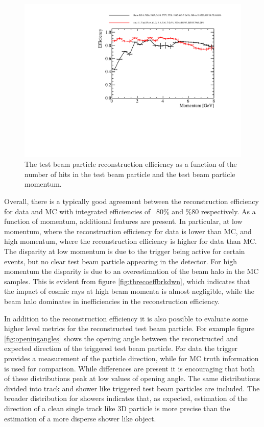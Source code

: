 \begin{figure}
\includegraphics[width=1.0\textwidth]{Figures/Metrics/Data/Beam/BeamParticleEfficiencyVsMomentum.pdf}
\caption{The test beam particle reconstruction efficiency as a function of the number of hits in the test beam particle and the test beam particle momentum.}
\label{fig:datamcrecoeff}
\end{figure}

Overall, there is a typically good agreement between the reconstruction efficiency for data and MC with integrated efficiencies of ~80\% and \%80 respectively.  As a function of momentum, additional features are present.  In particular, at low momentum, where the reconstruction efficiency for data is lower than MC, and high momentum, where the reconstruction efficiency is higher for data than MC.  The disparity at low momentum is due to the trigger being active for certain events, but no clear test beam particle appearing in the detector.  %
For high momentum the disparity is due to an overestimation of the beam halo in the MC samples.  This is evident from figure \ref{fig:tbrecoeffbrkdwn}, which indicates that the impact of cosmic rays at high beam momenta is almost negligible, while the beam halo dominates in inefficiencies in the reconstruction efficiency.  

In addition to the reconstruction efficiency it is also possible to evaluate some higher level metrics for the reconstructed test beam particle.  For example figure \ref{fig:openingangles} shows the opening angle between the reconstructed and expected direction of the triggered test beam particle.  For data the trigger provides a measurement of the particle direction, while for MC truth information is used for comparison.  While differences are present it is encouraging that both of these distributions peak at low values of opening angle.  The same distributions divided into track and shower like triggered test beam particles are included.  The broader distribution for showers indicates that, as expected, estimation of the direction of a clean single track like 3D particle is more precise than the estimation of a more disperse shower like object.   

